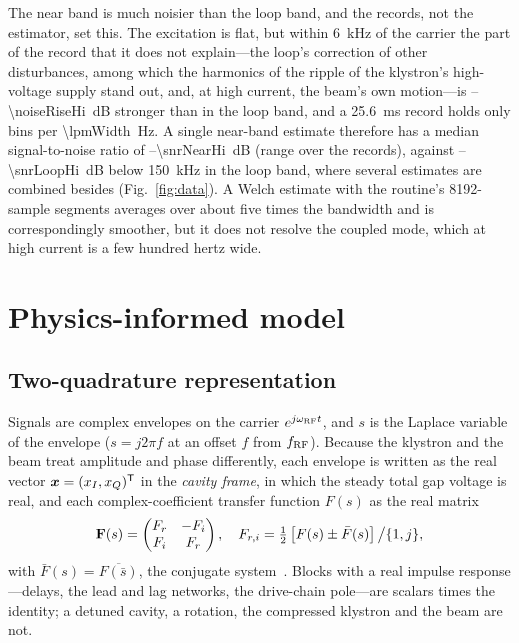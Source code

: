 The near band is much noisier than the loop band, and the records, not the estimator, set this. The excitation is flat, but within \SI{6}{kHz} of the carrier the part of the record that it does not explain---the loop's correction of other disturbances, among which the harmonics of the ripple of the klystron's high-voltage supply stand out, and, at high current, the beam's own motion---is \noiseRiseLo--\SI{\noiseRiseHi}{dB} stronger than in the loop band, and a \SI{25.6}{ms} record holds only \lpmBins{} bins per \SI{\lpmWidth}{Hz}. A single near-band estimate therefore has a median signal-to-noise ratio of \snrNearLo--\SI{\snrNearHi}{dB} (range over the records), against \snrLoopLo--\SI{\snrLoopHi}{dB} below \SI{150}{kHz} in the loop band, where several estimates are combined besides (Fig.~\ref{fig:data}). A Welch estimate with the routine's 8192-sample segments averages over about five times the bandwidth and is correspondingly smoother, but it does not resolve the coupled mode, which at high current is a few hundred hertz wide.

\section{Physics-informed model}\label{sec:model}

\subsection{Two-quadrature representation}

Signals are complex envelopes on the carrier $e^{j\omega_\mathrm{RF} t}$, and $s$ is the Laplace variable of the envelope ($s=j2\pi f$ at an offset $f$ from $f_\mathrm{RF}$). Because the klystron and the beam treat amplitude and phase differently, each envelope is written as the real vector $\bm{x}=(x_I,x_Q)^\mathsf{T}$ in the \emph{cavity frame}, in which the steady total gap voltage is real, and each complex-coefficient transfer function $F(s)$ as the real matrix
\begin{equation}\label{eq:realmatrix}
\mathbf{F}(s)=\begin{pmatrix}F_r & -F_i\\ F_i & F_r\end{pmatrix},\quad
F_{r,i}=\tfrac{1}{2}\left[F(s)\pm\bar F(s)\right]\big/\{1,j\},
\end{equation}
with $\bar F(s)=\overline{F(\bar s)}$, the conjugate system~\cite{Schreier2010}. Blocks with a real impulse response---delays, the lead and lag networks, the drive-chain pole---are scalars times the identity; a detuned cavity, a rotation, the compressed klystron and the beam are not.

